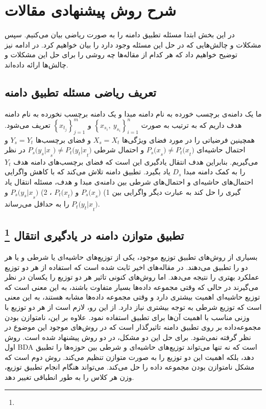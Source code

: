 \section{شرح روش پیشنهادی مقالات}
{ 	
	در این بخش ابتدا مسئله تطبیق دامنه را به صورت ریاضی بیان می‌کنیم. سپس مشکلات و چالش‌هایی که در حل این مسئله وجود دارد را بیان خواهیم کرد. در ادامه نیز توضیح خواهیم داد که هر کدام از مقاله‌ها چه روشی را برای حل این مشکلات و چالش‌ها ارائه داده‌اند.
	
	\subsection{تعریف ریاضی مسئله تطبیق دامنه}
	
	ما یک دامنه‌ی برچسب خورده به نام دامنه مبدا و یک دامنه برچسب نخورده به نام دامنه هدف داریم که به ترتیب به  صورت 
$\left\{x_{s_i},\ y_{s_i}\right\}_{i=1} ^ n $
و 
$\left\{x_{t_j}\right\}_{j=1} ^ m$
تعریف می‌شود. همچینین فرضیاتی را در مورد فضای ویژگی‌ها
$X_s = X_t$
و فضای برچسب‌ها
$Y_s=Y_t$
و احتمال حاشیه‌ای  
${P_s(x}_s)\neq{P_t(x}_t)$
و احتمال شرطی
${P_s(y_s|x}_s)\neq{P_t(y_t|x}_t)$
در نظر می‌گیریم. بنابراین هدف انتقال یادگیری این است که فضای برچسب‌های دامنه هدف 
$Y_t$
را به کمک دامنه مبدا
$D_s$
 یاد بگیرد. تطبیق دامنه تلاش می‌کند که با کاهش واگرایی احتمال‌های حاشیه‌ای و احتمال‌های شرطی  بین دامنه‌ی مبدا و هدف، مسئله انتقال یاد گیری را حل کند به عبارت دیگر واگرایی بین 1)
 ${P_s(x}_s)$
 و 
 ${P_t(x}_t)$
 ، 2) 
 ${P_s(y_s|x}_s)$
 و
 ${P_t(y_t|x}_t)$
 را به حداقل می‌رساند.
	
	\subsection{
		تطبیق  متوازن دامنه در یادگیری انتقال
		\protect \footnote{} 
	}
	{
		بسیاری از روش‌های تطبیق توزیع موجود، یکی از توزیع‌های حاشیه‌ای یا شرطی و یا هر دو را تطبیق می‌دهند. در مقاله‌های اخیر ثابت شده است که استفاده از هر دو توزیع عملکرد بهتری را نتیجه می‌دهد. اما روش‌های کنونی تاثیر هر دو توزیع را یکسان در نظر می‌گیرند در حالی که وقتی مجموعه داده‌ها بسیار متفاوت باشند، به این معنی است که توزیع حاشیه‌ای اهمیت بیشتری دارد و وقتی مجموعه داده‌ها مشابه هستند، به این معنی است که توزیع شرطی به توجه بیشتری نیاز دارد. از این رو، لازم است از هر دو توزیع با وزنی مناسب با اهمیت آن‌ها برای تطبیق استفاده نمود. علاوه بر این، نامتوازن بودن مجموعه‌داده بر روی تطبیق دامنه تاثیرگذار است که در روش‌های موجود این موضوع در نظر گرفته نمی‌شود. برای حل این دو مشکل، در
\cite{wang2017balanced}
دو روش پیشنهاد شده است. روش اول BDA است که نه تنها می‌تواند توزیع‌های حاشیه‌ای و شرطی بین حوزه‌ها را تطبیق دهد، بلکه اهمیت این دو توزیع را به صورت متوازن تنظیم می‌کند. روش دوم
است که مشکل نامتوازن بودن مجموعه داده را حل می‌کند.
 می‌تواند هنگام انجام تطبیق توزیع، وزن هر کلاس را به طور انطباقی تغییر دهد.
}}

